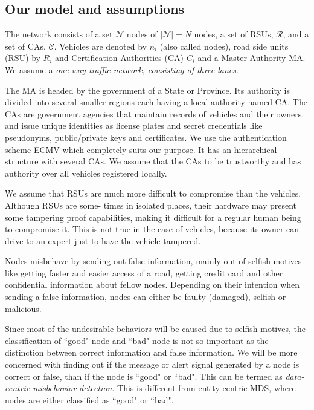 \documentclass[conference]{IEEEtran}[10pt]
\begin{document}
\subsection{Our model and assumptions}
\label{subsec:model}
The network consists of a set $\mathcal{N}$ nodes of $|\mathcal{N}| = N$ nodes, a set of RSUs,   $\mathcal{R}$,  and 
a set of CAs, $\mathcal{C}$. 
Vehicles are denoted by $n_i$ (also called nodes), road side units (RSU) by $R_i$ and Certification Authorities (CA) $C_i$ and a Master Authority MA. 
We assume a \emph{one way traffic network, consisting of three lanes}.  

 The MA is headed by the government of a State or Province. Its authority is divided into several smaller regions each 
having a  local authority named CA. 
The CAs are government agencies that maintain records of vehicles and their owners, and issue
unique identities as license plates and secret credentials like pseudonyms, 
public/private keys and certificates. 
We use the authentication scheme ECMV \cite{WJS08} which completely suits our purpose.
It has an  hierarchical structure with several CAs. 
We assume that the CAs to be trustworthy and has
authority over all vehicles registered locally.


  We assume that RSUs are much more difficult to
compromise than the vehicles. Although RSUs are some-
times in isolated places, their hardware may present
some tampering proof capabilities, making it difficult
for a regular human being to compromise it. This is not
true in the case of vehicles, because its owner can drive
to an expert just to have the vehicle tampered.

Nodes misbehave by sending out false information, mainly out of selfish motives like getting faster and easier access of a road, 
getting credit card and other confidential information about fellow nodes. 
Depending on
their intention when sending a false information, nodes
can either be faulty (damaged), selfish or malicious.


Since most of the undesirable behaviors will be caused due to selfish motives, 
the classification of ``good" node and ``bad" node is not so important as the distinction between correct information and false information. 
We will be more
concerned with finding out if the message or alert signal
generated by a node is correct or false, than if the node
is ``good" or ``bad". 
This can be termed as \emph{data-centric misbehavior detection}. 
This is different from entity-centric MDS, where nodes are either classified as ``good" or ``bad". 
\end{document}

